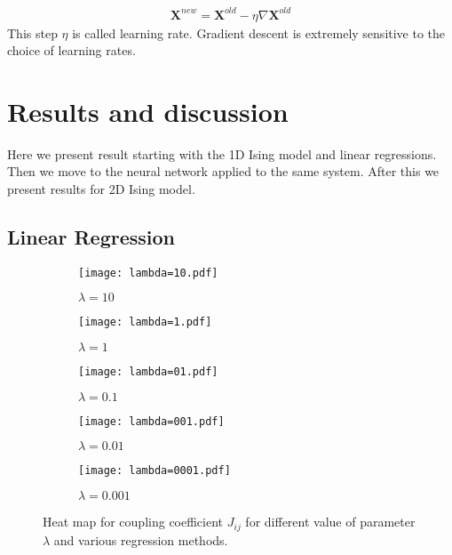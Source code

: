 \documentclass[10pt]{article}
\begin{document}
\begin{align}
\textbf{X}^{new}=\textbf{X}^{old} - \eta \nabla\textbf{X}^{old}
\end{align}
This step $\eta$ is called learning rate. Gradient descent is extremely sensitive to the choice of learning rates.


\section{Results and discussion}
Here we present result starting with the 1D Ising model and linear regressions. Then we move to the neural network applied to the same system. After this we present results for 2D Ising model.


\subsection{Linear Regression }


\begin{figure}
	\centering
	
	\begin{subfigure}[b]{0.9\textwidth}  
		\centering 
		\texttt{[image: lambda=10.pdf]}
		\caption[]%
		{{\small $\lambda = \num{10}$}}    
		\label{fig:lm10}
	\end{subfigure}
	\hfill
	\begin{subfigure}[b]{0.9\textwidth}   
		\centering 
		\texttt{[image: lambda=1.pdf]}
		\caption[]%
		{{\small $\lambda = \num{1}$}}    
		\label{fig:lm1}
	\end{subfigure}
	\quad
	\begin{subfigure}[b]{0.9\textwidth}   
		\centering 
		\texttt{[image: lambda=01.pdf]}
		\caption[]%
		{{\small $\lambda =\num{0.1}$}}    
		\label{fig:lm01}
	\end{subfigure}
		\quad
	\begin{subfigure}[b]{0.9\textwidth}   
		\centering 
		\texttt{[image: lambda=001.pdf]}
		\caption[]%
		{{\small $\lambda = \num{0.01}$}}    
		\label{fig:lm001}
	\end{subfigure}
	\quad
\begin{subfigure}[b]{0.9\textwidth}   
	\centering 
	\texttt{[image: lambda=0001.pdf]}
	\caption[]%
	{{\small $\lambda = \num{0.001}$}}    
	\label{fig:lm0001}
\end{subfigure}
	\caption[ The average and standard deviation of critical parameters ]
	{\small Heat map for coupling coefficient $J_{ij}$ for different value of parameter $\lambda$ and various regression methods.} 
	\label{fig:lm}
\end{figure}
\end{document}
